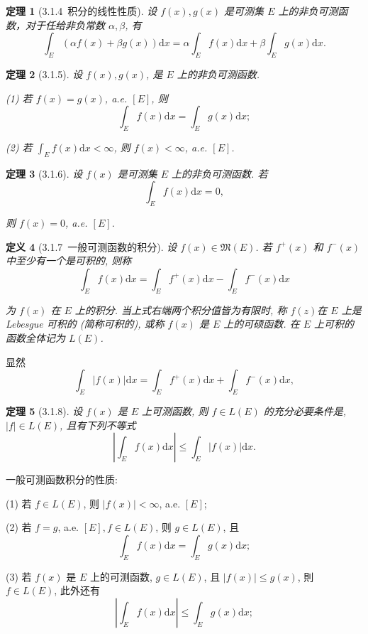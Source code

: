 \documentclass[10pt,openany]{book}
\theoremstyle{thmstyle} %
\newtheorem{theorem}{定理}[chapter]
\theoremstyle{defstyle} %
\newtheorem{definition}[theorem]{定义}
\theoremstyle{prostyle} %
\begin{document}
\begin{theorem}[3.1.4~积分的线性性质]
设 $f(x), g(x)$ 是可测集 $E$ 上的非负可测函数，对于任给非负常数 $\alpha, \beta$, 有
$$
\int_E(\alpha f(x)+\beta g(x)) \mathrm{d} x=\alpha \int_E f(x) \mathrm{d} x+\beta \int_E g(x) \mathrm{d} x .
$$
\end{theorem}

\begin{theorem}[3.1.5]
设 $f(x), g(x)$, 是 $E$ 上的非负可测函数. \

(1) 若 $f(x)=g(x)$, a.e. $[E]$, 则
$$
\int_E f(x) \mathrm{d} x=\int_E g(x) \mathrm{d} x ;
$$

(2) 若 $\int_E f(x) \mathrm{d} x<\infty$, 则 $f(x)<\infty$, a.e. $[E]$.
\end{theorem}

\begin{theorem}[3.1.6]
设 $f(x)$ 是可测集 $E$ 上的非负可测函数. 若
$$
\int_E f(x) \mathrm{d} x=0,
$$

则 $f(x)=0$, a.e. $[E]$.
\end{theorem}

\begin{definition}[3.1.7~一般可测函数的积分]
设 $f(x) \in \mathfrak{M}(E)$. 若 $f^{+}(x)$ 和 $f^{-}(x)$ 中至少有一个是可积的, 则称
$$
\int_E f(x) \mathrm{d} x=\int_E f^{+}(x) \mathrm{d} x-\int_E f^{-}(x) \mathrm{d} x
$$

为 $f(x)$ 在 $E$ 上的积分. 当上式右端两个积分值皆为有限时, 称 $f(z)$在 $E$ 上是 Lebesgue 可积的 (简称可积的), 或称 $f(x)$ 是 $E$ 上的可硕函数. 在 $E$ 上可积的函数全体记为 $L(E)$.
\end{definition}

显然
$$
\int_E|f(x)| \mathrm{d} x=\int_E f^{+}(x) \mathrm{d} x+\int_E f^{-}(x) \mathrm{d} x,
$$

\begin{theorem}[3.1.8]
设 $f(x)$ 是 $E$ 上可测函数, 则 $f \in L(E)$ 的充分必要条件是, $|f| \in L(E)$, 且有下列不等式
$$
\left|\int_E f(x) \mathrm{d} x\right| \leq \int_E|f(x)| \mathrm{d} x .
$$
\end{theorem}

一般可测函数积分的性质:

(1) 若 $f \in L(E)$, 则 $|f(x)|<\infty$, a.e. $[E]$;  

(2) 若 $f=g$, a.e. $[E], f \in L(E)$, 则 $g \in L(E)$, 且
$$
\int_E f(x) \mathrm{d} x=\int_E g(x) \mathrm{d} x ;
$$

(3) 若 $f(x)$ 是 $E$ 上的可测函数, $g \in L(E)$, 且 $|f(x)| \leq g(x)$, 則 $f \in L(E)$, 此外还有
$$
\left|\int_E f(x) \mathrm{d} x\right| \leq \int_E g(x) \mathrm{d} x ;
$$
\end{document}
